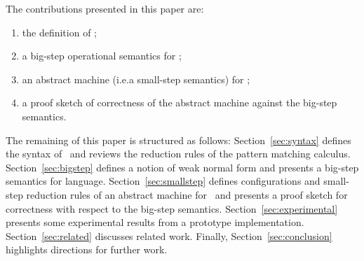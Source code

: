 The contributions presented in this paper are:
\begin{enumerate}
\item the definition of \lambdaPMC;
\item a big-step operational semantics for \lambdaPMC;
\item an abstract machine (i.e.\@ a small-step semantics) for \lambdaPMC;
\item a proof sketch of correctness of the abstract machine against
  the big-step semantics.
\end{enumerate}

The remaining of this paper is structured as follows:
Section~\ref{sec:syntax} defines the syntax of \lambdaPMC\ and reviews
the reduction rules of the pattern matching
calculus. Section~\ref{sec:bigstep} defines a notion of weak normal
form and presents a big-step semantics for language.
Section~\ref{sec:smallstep} defines configurations and small-step
reduction rules of an abstract machine for \lambdaPMC\ and presents a
proof sketch for correctness with respect to the big-step semantics.
Section~\ref{sec:experimental} presents some experimental results from a
prototype implementation.  Section~\ref{sec:related} discusses related
work. Finally, Section~\ref{sec:conclusion} highlights
directions for further work.





